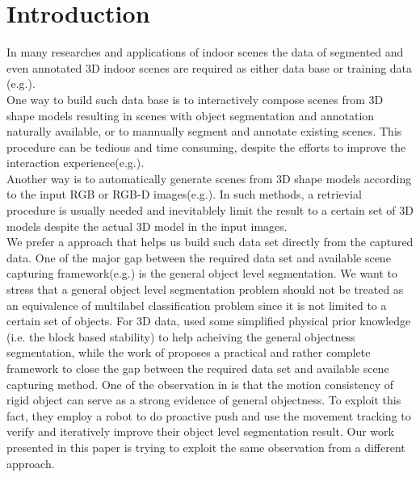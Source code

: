 \section{Introduction}
\label{sec:intro}
In many researches and applications of indoor scenes the data of segmented and even annotated 3D indoor scenes are required as either data base or training data (e.g.\cite{SearchClassify}\cite{SceneFromExample}\cite{Fisher:2012:ESO:2366145.2366154}\cite{Chen:2014:ASM:2661229.2661239}\cite{Fisher:ActivityCentricSceneSynthesis}).\\
One way to build such data base is to interactively compose scenes from 3D shape models resulting in scenes with object segmentation and annotation naturally available, or to mannually segment and annotate existing scenes. This procedure can be tedious and time consuming, despite the efforts to improve the interaction experience(e.g.\cite{Merrell:2011:IFL:2010324.1964982}\cite{Xu:2013:SSC:2461912.2461968}).\\
Another way is to automatically generate scenes from 3D shape models according to the input RGB or RGB-D images(e.g.\cite{Liu2015Model}\cite{Chen:2014:ASM:2661229.2661239}). In such methods, a retrievial procedure is usually needed and inevitablely limit the result to a certain set of 3D models despite the actual 3D model in the input images.\\
We prefer a approach that helps us build such data set directly from the captured data. One of the major gap between the required data set and available scene capturing framework(e.g.\cite{KinectFusion}) is the general object level segmentation. We want to stress that a general object level segmentation problem should not be treated as an equivalence of multilabel classification problem since it is not limited to a certain set of objects. For 3D data, \cite{3DReasoningfromBlockstoStability} used some simplified physical prior knowledge (i.e. the block based stability) to help acheiving the general objectness segmentation, while the work of \cite{Xu:2015:ACS:2816795.2818075} proposes a practical and rather complete framework to close the gap between the required data set and available scene capturing method. One of the observation in \cite{Xu:2015:ACS:2816795.2818075} is that the motion consistency of rigid object can serve as a strong evidence of general objectness. To exploit this fact, they employ a robot to do proactive push and use the movement tracking to verify and iteratively improve their object level segmentation result. Our work presented in this paper is trying to exploit the same observation from a different approach.\\
